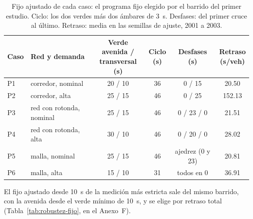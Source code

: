 \begin{table}[H]
\centering
\footnotesize
\setlength{\tabcolsep}{4pt}
\begin{tabular}{llcccc}
\toprule
Caso & Red y demanda & \makecell{Verde avenida /\\transversal (s)} & \makecell{Ciclo\\(s)} & Desfases (s) & \makecell{Retraso\\(s/veh)} \\
\midrule
P1 & corredor, nominal        & 20 / 10 & 36 & 0 / 15           & 20.50  \\
P2 & corredor, alta           & 25 / 15 & 46 & 0 / 25           & 152.13 \\
P3 & red con rotonda, nominal & 25 / 15 & 46 & 0 / 23 / 0       & 21.51  \\
P4 & red con rotonda, alta    & 30 / 10 & 46 & 0 / 20 / 0       & 28.02  \\
P5 & malla, nominal           & 25 / 15 & 46 & ajedrez (0 y 23) & 20.81  \\
P6 & malla, alta              & 15 / 10 & 31 & todos en 0       & 36.91  \\
\bottomrule
\end{tabular}
\caption[Fijo ajustado de cada caso]{Fijo ajustado de cada caso: el programa fijo elegido por el
barrido del primer estudio. Ciclo: los dos verdes más dos ámbares de 3~s. Desfases: del primer
cruce al último. Retraso: media en las semillas de ajuste, 2001 a 2003.}
\label{tab:plan2-fijo}
\end{table}


El fijo ajustado desde 10~s de la medición más estricta sale del mismo
barrido, con la avenida desde el verde mínimo de 10~s, y se elige por
retraso total (Tabla~\ref{tab:robustez-fijo}, en el Anexo~F).

